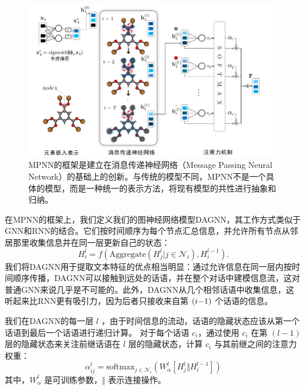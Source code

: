\begin{figure}[t]
	\centering
    \includegraphics[width=0.95\linewidth]{figures/MPNN.png}
    \vspace{8pt}
	\caption{MPNN的框架是建立在消息传递神经网络（Message Passing Neural Network）的基础上的创新。与传统的模型不同，MPNN不是一个具体的模型，而是一种统一的表示方法，将现有模型的共性进行抽象和归纳。}
    \label{fig:mpnn}
\end{figure}


在MPNN的框架上，我们定义我们的图神经网络模型DAGNN，其工作方式类似于GNN和RNN的结合。它们按时间顺序为每个节点汇总信息，并允许所有节点从邻居那里收集信息并在同一层更新自己的状态：
\vspace{3pt}  \begin{equation}
H^l_i = f(\text{Aggregate}({H^{l}_j|j\in\mathcal{N}_i}),H^{l-1}_i).
\end{equation} \vspace{4pt}
我们将DAGNN用于提取文本特征的优点相当明显：通过允许信息在同一层内按时间顺序传播，DAGNN可以接触到远处的话语，并在整个对话中建模信息流，这对普通GNN来说几乎是不可能的。此外，DAGNN从几个相邻话语中收集信息，这听起来比RNN更有吸引力，因为后者只接收来自第 $(i\hspace{-0.07cm}-\hspace{-0.07cm}1)$ 个话语的信息。




我们在DAGNN的每一层 $l$ ，由于时间信息的流动，话语的隐藏状态应该从第一个话语到最后一个话语进行递归计算。
对于每个话语 $c_i$，通过使用 $c_i$ 在第 $(l-1)$ 层的隐藏状态来关注前继话语在 $l$ 层的隐藏状态，计算 $c_i$ 与其前继之间的注意力权重：
\vspace{3pt}  \begin{equation}
    \alpha^l_{ij} = \text{softmax}_{j\in\mathcal{N}_i}(W^l_\alpha[H^l_j\Vert H^{l-1}_i])
\end{equation} \vspace{4pt}
其中，$W_\alpha^l$ 是可训练参数，$\Vert$ 表示连接操作。

